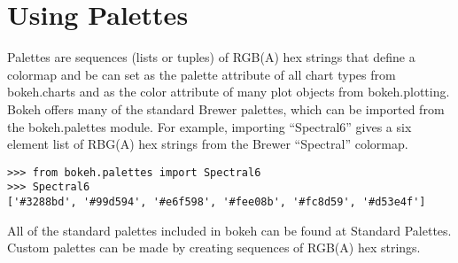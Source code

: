 
\section{Using Palettes}
Palettes are sequences (lists or tuples) of RGB(A) hex strings that define a colormap and be can set as the palette attribute of all chart types from bokeh.charts and as the color attribute of many plot objects from bokeh.plotting. Bokeh offers many of the standard Brewer palettes, which can be imported from the bokeh.palettes module. For example, importing “Spectral6” gives a six element list of RBG(A) hex strings from the Brewer “Spectral” colormap.

\begin{framed}
\begin{verbatim}
>>> from bokeh.palettes import Spectral6
>>> Spectral6
['#3288bd', '#99d594', '#e6f598', '#fee08b', '#fc8d59', '#d53e4f']
\end{verbatim}
\end{framed}
All of the standard palettes included in bokeh can be found at Standard Palettes. Custom palettes can be made by creating sequences of RGB(A) hex strings.

